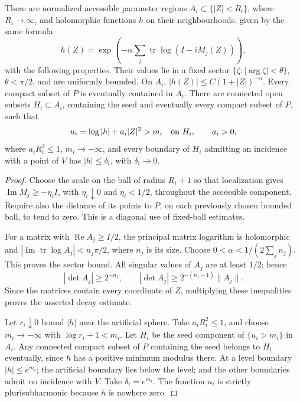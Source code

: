 \begin{lemma}\label{lem:quo-guard}
There are normalized accessible parameter regions $A_i\subset\{|Z|<R_i\}$, where $R_i\to\infty$, and holomorphic functions $h$ on their neighbourhoods, given by the same formula
\begin{equation}\label{eq:quo-guard-formula}
 h(Z)=\exp\left(-\alpha\sum_j\operatorname{tr}
                      \log(I-iM_j(Z))\right),
\end{equation}
with the following properties. Their values lie in a fixed sector $\{\zeta:|\arg\zeta|<\theta\}$, $\theta<\pi/2$, and are uniformly bounded. On $A_i$, $|h(Z)|\leq C(1+|Z|)^{-\alpha}$. Every compact subset of $P$ is eventually contained in $A_i$. There are connected open subsets $H_i\subset A_i$, containing the seed and eventually every compact subset of $P$, such that
\[
 u_i=\log|h|+a_i|Z|^2>m_i\quad\hbox{on }H_i,
 \qquad a_i>0,
\]
where $a_iR_i^2\leq1$, $m_i\to-\infty$, and every boundary of $H_i$ admitting an incidence with a point of $V$ has $|h|\leq\delta_i$, with $\delta_i\to0$.
\end{lemma}
\begin{proof}
Choose the scale on the ball of radius $R_i+1$ so that localization gives $\operatorname{Im}M_j\geq-\eta_i I$, with $\eta_i\downarrow0$ and $\eta_i<1/2$, throughout the accessible component. Require also the distance of its points to $\overline P$, on each previously chosen bounded ball, to tend to zero. This is a diagonal use of fixed-ball estimates.

For a matrix with $\operatorname{Re}A_j\geq I/2$, the principal matrix logarithm is holomorphic and $|\operatorname{Im}\operatorname{tr}\log A_j|<n_j\pi/2$, where $n_j$ is its size. Choose $0<\alpha<1/(2\sum_jn_j)$. This proves the sector bound. All singular values of $A_j$ are at least $1/2$; hence
\[
 |\det A_j|\geq2^{-n_j},\qquad
 |\det A_j|\geq2^{-(n_j-1)}\|A_j\|.
\]
Since the matrices contain every coordinate of $Z$, multiplying these inequalities proves the asserted decay estimate.

Let $r_i\downarrow0$ bound $|h|$ near the artificial sphere. Take $a_iR_i^2\leq1$, and choose $m_i\to-\infty$ with $\log r_i+1<m_i$. Let $H_i$ be the seed component of $\{u_i>m_i\}$ in $A_i$. Any connected compact subset of $P$ containing the seed belongs to $H_i$ eventually, since $h$ has a positive minimum modulus there. At a level boundary $|h|\leq e^{m_i}$; the artificial boundary lies below the level; and the other boundaries admit no incidence with $V$. Take $\delta_i=e^{m_i}$. The function $u_i$ is strictly plurisubharmonic because $h$ is nowhere zero.
\end{proof}

